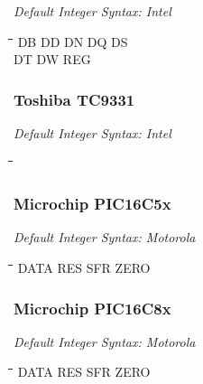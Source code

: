 {\em Default Integer Syntax: Intel}

{\tt\begin{tabbing}
\hspace{3cm}\=\hspace{3cm}\=\hspace{3cm}\=\hspace{3cm}\=\kill
DB         \> DD          \> DN         \> DQ          \> DS \\
DT         \> DW          \> REG \\
\end{tabbing}}

\subsubsection{Toshiba TC9331}

{\em Default Integer Syntax: Intel}

{\tt\begin{tabbing}
\hspace{3cm}\=\hspace{3cm}\=\hspace{3cm}\=\hspace{3cm}\=\kill
\end{tabbing}}

\subsubsection{Microchip PIC16C5x}

{\em Default Integer Syntax: Motorola}

{\tt\begin{tabbing}
\hspace{3cm}\=\hspace{3cm}\=\hspace{3cm}\=\hspace{3cm}\=\kill
DATA       \> RES         \> SFR         \> ZERO \\
\end{tabbing}}

\subsubsection{Microchip PIC16C8x}

{\em Default Integer Syntax: Motorola}

{\tt\begin{tabbing}
\hspace{3cm}\=\hspace{3cm}\=\hspace{3cm}\=\hspace{3cm}\=\kill
DATA       \> RES         \> SFR         \> ZERO \\
\end{tabbing}}

